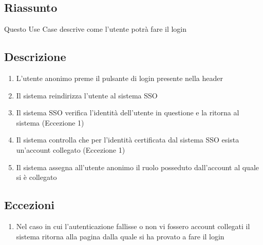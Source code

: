         \subsection{Riassunto}
            Questo Use Case descrive come l'utente potrà fare il login
        \subsection{Descrizione}
            \begin{enumerate}
                \item L'utente anonimo preme il pulsante di login presente nella header
                \item Il sistema reindirizza l'utente al sistema SSO
                \item Il sistema SSO verifica l'identità dell'utente in questione e la ritorna al sistema (Eccezione 1)
                \item Il sistema controlla che per l'identità certificata dal sistema SSO esista un'account collegato (Eccezione 1)
                \item Il sistema assegna all'utente anonimo il ruolo posseduto dall'account al quale si è collegato
            \end{enumerate}
        \subsection{Eccezioni}
            \begin{enumerate}
                \item Nel caso in cui l'autenticazione fallisse o non vi fossero account collegati il sistema ritorna alla pagina dalla quale si ha provato a fare il login
            \end{enumerate}